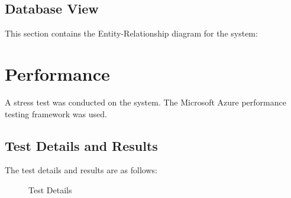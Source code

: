 \documentclass[11pt]{article}
\begin{document}
\subsection{Database View}
This section contains the Entity-Relationship diagram for the system:

\section{Performance}
A stress test was conducted on the system. The Microsoft Azure performance testing framework was used. 
\subsection{Test Details and Results} The test details and results are as follows:
\begin{figure}[H]
	\caption{Test Details}
\end{figure}
\end{document}
